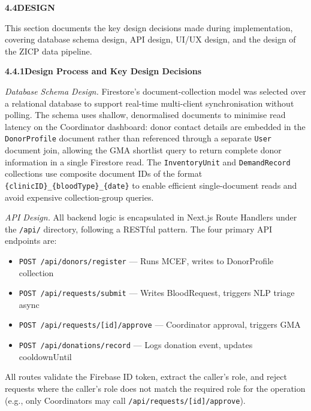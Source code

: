 \documentclass[12pt,a4paper]{article}
\begin{document}
\vspace{1.5em}
\noindent\textbf{4.4\quad DESIGN}
\vspace{0.6em}

\noindent This section documents the key design decisions made during implementation, covering database schema design, API design, UI/UX design, and the design of the ZICP data pipeline.

\vspace{1.5em}
\noindent\textbf{4.4.1\quad Design Process and Key Design Decisions}
\vspace{0.6em}

\noindent\textit{Database Schema Design.} Firestore's document-collection model was selected over a relational database to support real-time multi-client synchronisation without polling. The schema uses shallow, denormalised documents to minimise read latency on the Coordinator dashboard: donor contact details are embedded in the \texttt{DonorProfile} document rather than referenced through a separate \texttt{User} document join, allowing the GMA shortlist query to return complete donor information in a single Firestore read. The \texttt{InventoryUnit} and \texttt{DemandRecord} collections use composite document IDs of the format \texttt{\{clinicID\}\_\{bloodType\}\_\{date\}} to enable efficient single-document reads and avoid expensive collection-group queries.

\noindent\textit{API Design.} All backend logic is encapsulated in Next.js Route Handlers under the \texttt{/api/} directory, following a RESTful pattern. The four primary API endpoints are:

\begin{itemize}[leftmargin=1.5em, itemsep=0.3em]
    \item \texttt{POST /api/donors/register} — Runs MCEF, writes to DonorProfile collection
    \item \texttt{POST /api/requests/submit} — Writes BloodRequest, triggers NLP triage async
    \item \texttt{POST /api/requests/[id]/approve} — Coordinator approval, triggers GMA
    \item \texttt{POST /api/donations/record} — Logs donation event, updates cooldownUntil
\end{itemize}

\noindent All routes validate the Firebase ID token, extract the caller's role, and reject requests where the caller's role does not match the required role for the operation (e.g., only Coordinators may call \texttt{/api/requests/[id]/approve}).
\end{document}
